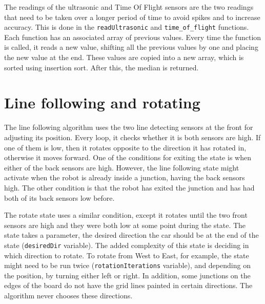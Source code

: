 \documentclass[11pt,a4paper,twoside]{article}
\begin{document}
The readings of the ultrasonic and Time Of Flight sensors are the two readings that
need to be taken over a longer period of time to avoid spikes and to increase
accuracy. This is done in the \verb|readUltrasonic| and \verb|time_of_flight| functions.
Each function has an associated array of previous values. Every time the function is called,
it reads a new value, shifting all the previous values by one and placing the new value at the end.
These values are copied into a new array, which is sorted using insertion sort. After this,
the median is returned.

\section{Line following and rotating}

The line following algorithm uses the two line detecting sensors at the front for adjusting its position.
Every loop, it checks whether it is both sensors are high. If one of them is low, then it
rotates opposite to the direction it has rotated in, otherwise it moves forward. One of the conditions for exiting the state is when either of the back sensors are high.
However, the line following state might activate when the robot is already inside a junction, having the back sensors high. The other condition is that the robot has
exited the junction and has had both of its back sensors low before.

The rotate state uses a similar condition, except it rotates until the two front sensors are high and they were both low at some point during the state.
The state takes a parameter, the desired direction the car should be at the end of the state (\verb|desiredDir| variable).
The added complexity of this state is deciding in which direction to rotate. To rotate from West to East, for example, the state might need to be run twice (\verb|rotationIterations| variable), and depending on the position, by turning either left or right. In addition,
some junctions on the edges of the board do not have the grid lines painted in certain directions. The algorithm never chooses these directions.
\end{document}
